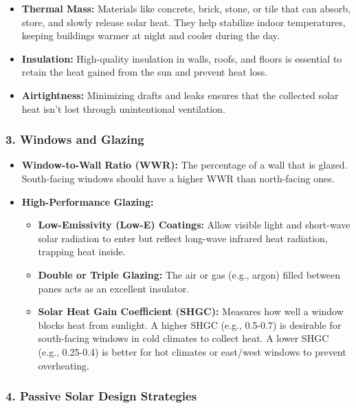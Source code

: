 \documentclass[
  10pt,
  letterpaper,
]{scrbook}
\providecommand{\tightlist}{%
  \setlength{\itemsep}{0pt}\setlength{\parskip}{0pt}}
\begin{document}
\begin{itemize}
\tightlist
\item
  \textbf{Thermal Mass:} Materials like concrete, brick, stone, or tile
  that can absorb, store, and slowly release solar heat. They help
  stabilize indoor temperatures, keeping buildings warmer at night and
  cooler during the day.
\item
  \textbf{Insulation:} High-quality insulation in walls, roofs, and
  floors is essential to retain the heat gained from the sun and prevent
  heat loss.
\item
  \textbf{Airtightness:} Minimizing drafts and leaks ensures that the
  collected solar heat isn't lost through unintentional ventilation.
\end{itemize}

\subsubsection{3. Windows and Glazing}\label{windows-and-glazing}

\begin{itemize}
\tightlist
\item
  \textbf{Window-to-Wall Ratio (WWR):} The percentage of a wall that is
  glazed. South-facing windows should have a higher WWR than
  north-facing ones.
\item
  \textbf{High-Performance Glazing:}

  \begin{itemize}
  \tightlist
  \item
    \textbf{Low-Emissivity (Low-E) Coatings:} Allow visible light and
    short-wave solar radiation to enter but reflect long-wave infrared
    heat radiation, trapping heat inside.
  \item
    \textbf{Double or Triple Glazing:} The air or gas (e.g., argon)
    filled between panes acts as an excellent insulator.
  \item
    \textbf{Solar Heat Gain Coefficient (SHGC):} Measures how well a
    window blocks heat from sunlight. A higher SHGC (e.g., 0.5-0.7) is
    desirable for south-facing windows in cold climates to collect heat.
    A lower SHGC (e.g., 0.25-0.4) is better for hot climates or
    east/west windows to prevent overheating.
  \end{itemize}
\end{itemize}

\subsubsection{4. Passive Solar Design
Strategies}\label{passive-solar-design-strategies}
\end{document}
